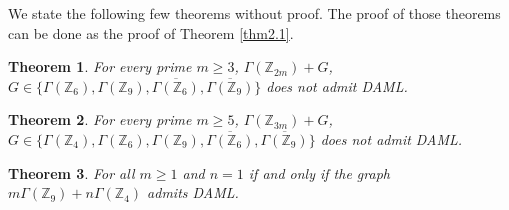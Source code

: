 \documentclass[12pt]{article}
\newtheorem{theorem}{Theorem}[section]
\newcommand{\mZ}{{\mathbb Z}}
\begin{document}
We state the following few theorems without proof.  The proof of those
theorems can be done as the proof of Theorem \ref{thm2.1}.
\begin{theorem}
	For every prime $m\geq 3$, $\Gamma(\mZ_{2m})+G$, $G\in \{\Gamma(\mZ_6),\Gamma(\mZ_9), \overline{\Gamma(\mZ_6)},  \overline{\Gamma(\mZ_9)}\}$ does not admit DAML.
\end{theorem}
\begin{theorem}
	For every prime $m\geq 5$, $\Gamma(\mZ_{3m})+G$, $G\in \{\Gamma(\mZ_4), \Gamma(\mZ_6), \Gamma(\mZ_9),  \overline{\Gamma(\mZ_6)}, \overline{\Gamma(\mZ_9)}\}$ does not admit DAML.
\end{theorem}

\begin{theorem}
	For all $m\geq 1$ and $n=1$ if and only if the graph $m\Gamma(\mZ_9)+n\Gamma(\mZ_4)$ admits DAML.
\end{theorem}
\end{document}
